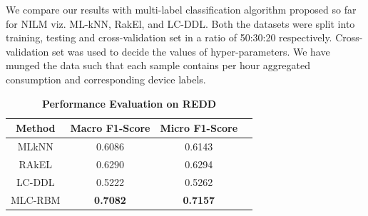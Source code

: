 \documentclass{article}
\begin{document}
 We compare our results with multi-label classification algorithm proposed so far for NILM viz. ML-kNN, RakEl, and LC-DDL. Both the datasets were split into training, testing and cross-validation set in a ratio of 50:30:20  respectively. Cross-validation set was used to decide the values of hyper-parameters. We have munged the data such that each sample contains per hour aggregated consumption and corresponding device labels.

\begin{table}[!ht]
\centering
\caption {\textbf{Performance Evaluation on REDD}}
\label{tab3}
\begin{tabular}{c c c c}
\toprule[0.2mm]

     \textbf{Method}    & \textbf{Macro F1-Score} &\textbf{ Micro F1-Score} \\
    \midrule
     MLkNN              &  0.6086          &  0.6143                     \\
    
     RAkEL              &  0.6290          &  0.6294                       \\
    
     LC-DDL             &  0.5222          &  0.5262                      \\
    
     MLC-RBM        &\textbf{0.7082}   &\textbf{0.7157}       \\
    \bottomrule[0.2mm]
     
\end{tabular}
\end{table}
\end{document}
